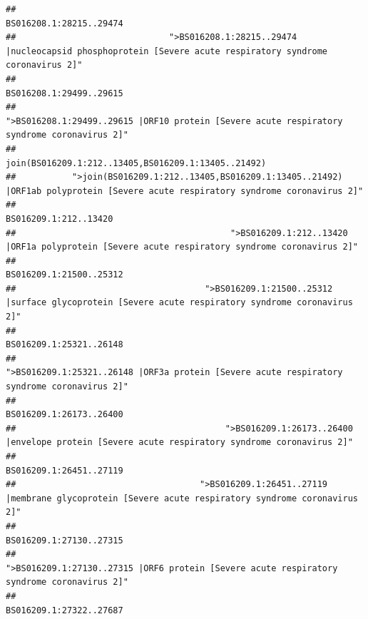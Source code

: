\documentclass[
]{article}
\begin{document}
\begin{verbatim}
##                                                                                                                BS016208.1:28215..29474 
##                              ">BS016208.1:28215..29474 |nucleocapsid phosphoprotein [Severe acute respiratory syndrome coronavirus 2]" 
##                                                                                                                BS016208.1:29499..29615 
##                                            ">BS016208.1:29499..29615 |ORF10 protein [Severe acute respiratory syndrome coronavirus 2]" 
##                                                                                    join(BS016209.1:212..13405,BS016209.1:13405..21492) 
##           ">join(BS016209.1:212..13405,BS016209.1:13405..21492) |ORF1ab polyprotein [Severe acute respiratory syndrome coronavirus 2]" 
##                                                                                                                  BS016209.1:212..13420 
##                                          ">BS016209.1:212..13420 |ORF1a polyprotein [Severe acute respiratory syndrome coronavirus 2]" 
##                                                                                                                BS016209.1:21500..25312 
##                                     ">BS016209.1:21500..25312 |surface glycoprotein [Severe acute respiratory syndrome coronavirus 2]" 
##                                                                                                                BS016209.1:25321..26148 
##                                            ">BS016209.1:25321..26148 |ORF3a protein [Severe acute respiratory syndrome coronavirus 2]" 
##                                                                                                                BS016209.1:26173..26400 
##                                         ">BS016209.1:26173..26400 |envelope protein [Severe acute respiratory syndrome coronavirus 2]" 
##                                                                                                                BS016209.1:26451..27119 
##                                    ">BS016209.1:26451..27119 |membrane glycoprotein [Severe acute respiratory syndrome coronavirus 2]" 
##                                                                                                                BS016209.1:27130..27315 
##                                             ">BS016209.1:27130..27315 |ORF6 protein [Severe acute respiratory syndrome coronavirus 2]" 
##                                                                                                                BS016209.1:27322..27687 

\end{verbatim}
\end{document}
